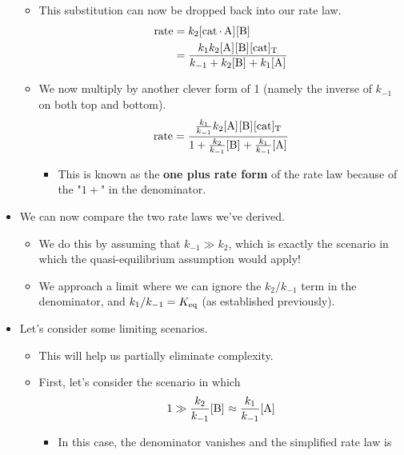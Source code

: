 \documentclass[../notes.tex]{subfiles}
\begin{document}
\begin{itemize}
\begin{itemize}
\begin{equation*}
        \end{equation*}
        \item This substitution can now be dropped back into our rate law.
        \begin{align*}
            \rate &= k_2\cnc{cat*A}\cnc{B}\\
            &= \frac{k_1k_2\cnc{A}\cnc{B}\cnc[T]{cat}}{k_{-1}+k_2\cnc{B}+k_1\cnc{A}}
        \end{align*}
        \item We now multiply by another clever form of 1 (namely the inverse of $k_{-1}$ on both top and bottom).
        \begin{equation*}
            \rate = \frac{\frac{k_1}{k_{-1}}k_2\cnc{A}\cnc{B}\cnc[T]{cat}}{1+\frac{k_2}{k_{-1}}\cnc{B}+\frac{k_1}{k_{-1}}\cnc{A}}
        \end{equation*}
        \begin{itemize}
            \item This is known as the \textbf{one plus rate form} of the rate law because of the "$1+$" in the denominator.
        \end{itemize}
    \end{itemize}
    \item We can now compare the two rate laws we've derived.
    \begin{itemize}
        \item We do this by assuming that $k_{-1}\gg k_2$, which is exactly the scenario in which the quasi-equilibrium assumption would apply!
        \item We approach a limit where we can ignore the $k_2/k_{-1}$ term in the denominator, and $k_1/k_{-1}=K_\textup{eq}$ (as established previously).
    \end{itemize}
    \item Let's consider some limiting scenarios.
    \begin{itemize}
        \item This will help us partially eliminate complexity.
        \item First, let's consider the scenario in which
        \begin{equation*}
            1 \gg \frac{k_2}{k_{-1}}\cnc{B} \approx \frac{k_1}{k_{-1}}\cnc{A}
        \end{equation*}
        \begin{itemize}
            \item In this case, the denominator vanishes and the simplified rate law is
            \begin{equation*}

\end{equation*}
\end{itemize}
\end{itemize}
\end{itemize}
\end{document}
